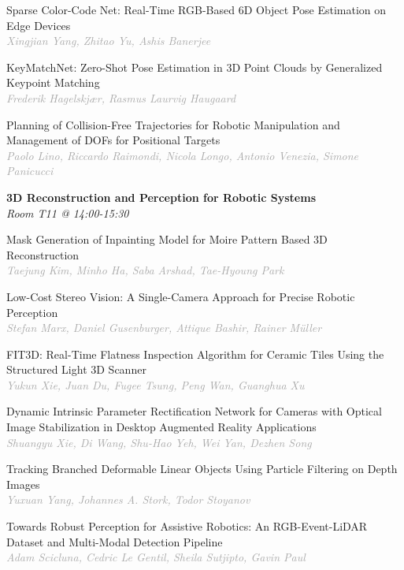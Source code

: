 \begin{multicols*}{2}
\small Sparse Color-Code Net: Real-Time RGB-Based 6D Object Pose Estimation on Edge Devices\\ 
\footnotesize \textcolor{darkgray}{\textit{Xingjian Yang, Zhitao  Yu, Ashis  Banerjee}}

\small KeyMatchNet: Zero-Shot Pose Estimation in 3D Point Clouds by Generalized Keypoint Matching\\ 
\footnotesize \textcolor{darkgray}{\textit{Frederik Hagelskjær, Rasmus Laurvig  Haugaard}}

\small Planning of Collision-Free Trajectories for Robotic Manipulation and Management of DOFs for Positional Targets\\ 
\footnotesize \textcolor{darkgray}{\textit{Paolo Lino, Riccardo  Raimondi, Nicola  Longo, Antonio  Venezia, Simone  Panicucci}}

\normalsize \textbf{3D Reconstruction and Perception for Robotic Systems}\\
\small \textit{Room T11 @ 14:00-15:30}

\small Mask Generation of Inpainting Model for Moire Pattern Based 3D Reconstruction\\ 
\footnotesize \textcolor{darkgray}{\textit{Taejung Kim, Minho  Ha, Saba  Arshad, Tae-Hyoung  Park}}

\small Low-Cost Stereo Vision: A Single-Camera Approach for Precise Robotic Perception\\ 
\footnotesize \textcolor{darkgray}{\textit{Stefan Marx, Daniel  Gusenburger, Attique  Bashir, Rainer  Müller}}

\small FIT3D: Real-Time Flatness Inspection Algorithm for Ceramic Tiles Using the Structured Light 3D Scanner\\ 
\footnotesize \textcolor{darkgray}{\textit{Yukun Xie, Juan  Du, Fugee  Tsung, Peng  Wan, Guanghua  Xu}}

\small Dynamic Intrinsic Parameter Rectification Network for Cameras with Optical Image Stabilization in Desktop Augmented Reality Applications\\ 
\footnotesize \textcolor{darkgray}{\textit{Shuangyu Xie, Di  Wang, Shu-Hao  Yeh, Wei  Yan, Dezhen  Song}}

\small Tracking Branched Deformable Linear Objects Using Particle Filtering on Depth Images\\ 
\footnotesize \textcolor{darkgray}{\textit{Yuxuan Yang, Johannes A.  Stork, Todor  Stoyanov}}

\small Towards Robust Perception for Assistive Robotics: An RGB-Event-LiDAR Dataset and Multi-Modal Detection Pipeline\\ 
\footnotesize \textcolor{darkgray}{\textit{Adam Scicluna, Cedric  Le Gentil, Sheila  Sutjipto, Gavin  Paul}}


\end{multicols*}
